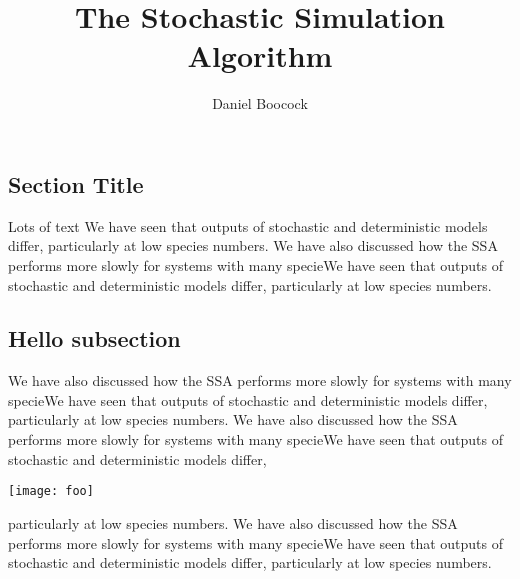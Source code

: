 \documentclass[11pt]{article}
\title{The Stochastic Simulation Algorithm}
\author{Daniel Boocock}
\newenvironment{Figure}
  {\par\medskip\noindent\minipage{\linewidth}}
  {\endminipage\par\medskip}
\begin{document}
\maketitle
\thispagestyle{title}
\noindent\makebox[\linewidth]{\rule{\textwidth}{0.4pt}}
\begin{multicols}{2}

\section{Section Title}
Lots of text We have seen that outputs of stochastic and deterministic models differ, particularly at low species numbers. We have also discussed how the SSA performs more slowly for systems with many specieWe have seen that outputs of stochastic and deterministic models differ, particularly at low species numbers.
\subsection{Hello subsection}
We have also discussed how the SSA performs more slowly for systems
with many specieWe have seen that outputs of stochastic and
deterministic models differ, particularly at low species numbers. We
have also discussed how the SSA performs more slowly for systems with
many specieWe have seen that outputs of stochastic and deterministic
models differ,
\begin{Figure}
 \centering
 \texttt{[image: foo]}
\end{Figure}
particularly at low species numbers. We have also discussed how the
SSA performs more slowly for systems with many specieWe have seen that
outputs of stochastic and deterministic models differ, particularly at
low species numbers.

\end{multicols}
\end{document}
